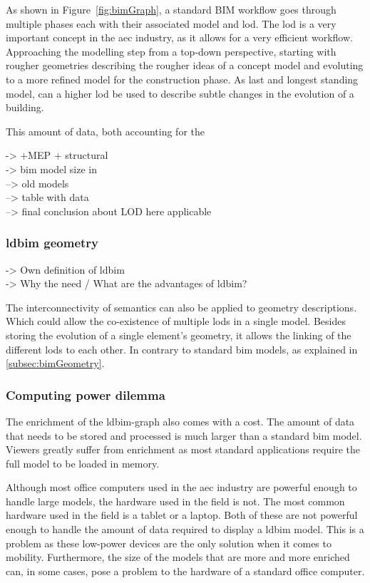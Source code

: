 As shown in Figure~\ref{fig:bimGraph}, a standard BIM workflow goes through multiple phases each with their associated model and \ac{lod}. The \ac{lod} is a very important concept in the \ac{aec} industry, as it allows for a very efficient workflow. Approaching the modelling step from a top-down perspective, starting with rougher geometries describing the rougher ideas of a concept model and evoluting to a more refined model for the construction phase. As last and longest standing model, can a higher \ac{lod} be used to describe subtle changes in the evolution of a building.

This amount of data, both accounting for the

-> +MEP + structural\\
-> bim model size in \cite{Johansson2015}\\
--> old models\\
--> table with data\\
--> final conclusion about LOD here applicable

\subsubsection{\acs{ldbim} geometry}
-> Own definition of \ac{ldbim}\\
-> Why the need / What are the advantages of \ac{ldbim}?

The interconnectivity of semantics can also be applied to geometry descriptions. Which could allow the co-existence of multiple \ac{lod}s in a single model. Besides storing the evolution of a single element's geometry, it allows the linking of the different \ac{lod}s to each other. In contrary to standard \ac{bim} models, as explained in \ref{subsec:bimGeometry}.

\subsubsection{Computing power dilemma} \label{subsec:computingPower}
The enrichment of the \ac{ldbim}-graph also comes with a cost. The amount of data that needs to be stored and processed is much larger than a standard \ac{bim} model. Viewers greatly suffer from enrichment as most standard applications require the full model to be loaded in memory.

Although most office computers used in the \ac{aec} industry are powerful enough to handle large models, the hardware used in the field is not. The most common hardware used in the field is a tablet or a laptop. Both of these are not powerful enough to handle the amount of data required to display a \ac{ldbim} model. This is a problem as these low-power devices are the only solution when it comes to mobility. Furthermore, the size of the models that are more and more enriched can, in some cases, pose a problem to the hardware of a standard office computer.

